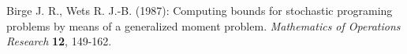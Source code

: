 \begin{thebibliography}{99}

    Birge J. R., Wets R. J.-B. (1987): Computing bounds for stochastic programing problems by means of a generalized moment problem. \textit{Mathematics of Operations Research} \textbf{12}, 149-162.
\end{thebibliography}